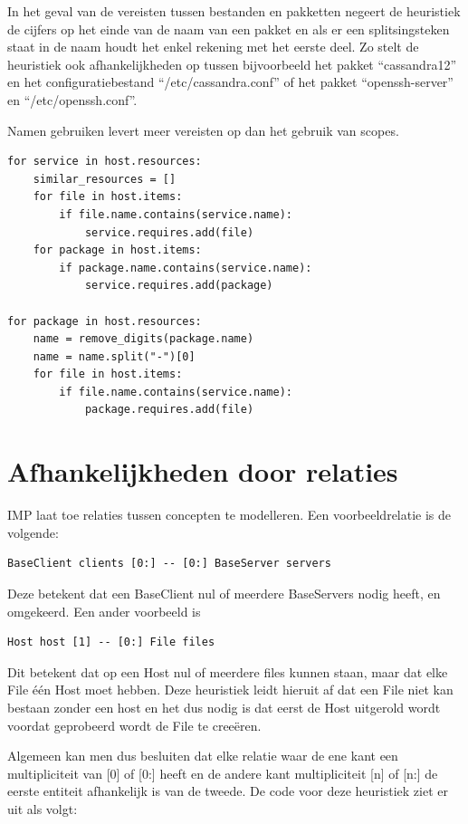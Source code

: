 In het geval van de vereisten tussen bestanden en pakketten negeert de heuristiek de cijfers op het einde van de naam van een pakket en als er een splitsingsteken staat in de naam houdt het enkel rekening met het eerste deel.
Zo stelt de heuristiek ook afhankelijkheden op tussen bijvoorbeeld het pakket ``cassandra12'' en het configuratiebestand ``/etc/cassandra.conf'' of het pakket ``openssh-server'' en ``/etc/openssh.conf''. 

Namen gebruiken levert meer vereisten op dan het gebruik van scopes.

\begin{minipage}{\textwidth}
\begin{lstlisting}
for service in host.resources:
    similar_resources = []
    for file in host.items:
        if file.name.contains(service.name):
            service.requires.add(file)
    for package in host.items:
        if package.name.contains(service.name):
            service.requires.add(package)

for package in host.resources:
    name = remove_digits(package.name)
    name = name.split("-")[0]
    for file in host.items:
        if file.name.contains(service.name):
            package.requires.add(file)
\end{lstlisting}
\end{minipage}

\section{Afhankelijkheden door relaties}
\label{sec:relaties}
IMP laat toe relaties tussen concepten te modelleren.
Een voorbeeldrelatie is de volgende:
\begin{lstlisting}
BaseClient clients [0:] -- [0:] BaseServer servers
\end{lstlisting}
Deze betekent dat een BaseClient nul of meerdere BaseServers nodig heeft, en omgekeerd.
Een ander voorbeeld is 
\begin{lstlisting}
Host host [1] -- [0:] File files
\end{lstlisting}
Dit betekent dat op een Host nul of meerdere files kunnen staan, maar dat elke File \'e\'en Host moet hebben.
Deze heuristiek leidt hieruit af dat een File niet kan bestaan zonder een host en het dus nodig is dat eerst de Host uitgerold wordt voordat geprobeerd wordt de File te cree\"eren.

Algemeen kan men dus besluiten dat elke relatie waar de ene kant een multipliciteit van [0] of [0:] heeft en de andere kant multipliciteit [n] of [n:] de eerste entiteit afhankelijk is van de tweede.
De code voor deze heuristiek ziet er uit als volgt:

